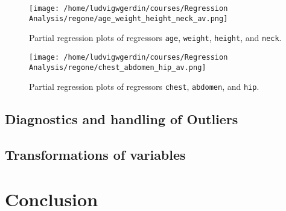 \documentclass[11pt]{article}
\begin{document}
\begin{figure}[htbp]
\centering
\texttt{[image: /home/ludvigwgerdin/courses/Regression Analysis/regone/age\_weight\_height\_neck\_av.png]}
\caption{\label{fig:org620f868}
Partial regression plots of regressors \texttt{age}, \texttt{weight}, \texttt{height}, and \texttt{neck}.}
\end{figure}

\begin{figure}[htbp]
\centering
\texttt{[image: /home/ludvigwgerdin/courses/Regression Analysis/regone/chest\_abdomen\_hip\_av.png]}
\caption{\label{fig:org810e6b9}
Partial regression plots of regressors \texttt{chest}, \texttt{abdomen}, and \texttt{hip}.}
\end{figure}
\subsection{Diagnostics and handling of Outliers}
\label{sec:orgea24267}
\subsection{Transformations of variables}
\label{sec:org8588221}
\section{Conclusion}
\label{sec:org28eddaf}


\end{document}
